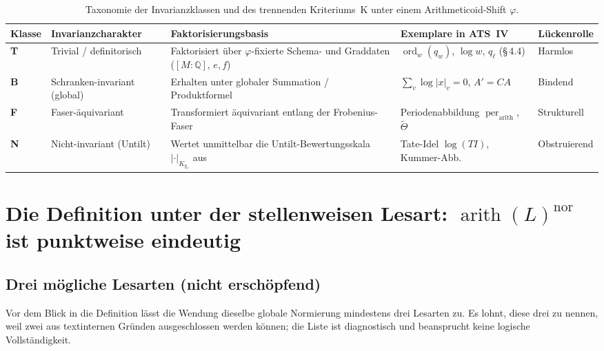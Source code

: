 \documentclass[11pt,a4paper]{article}
\theoremstyle{definition}
\theoremstyle{plain}
\theoremstyle{definition}
\newcommand{\arith}{\operatorname{arith}}
\newcommand{\ordd}{\operatorname{ord}}
\newcommand{\Thet}{\widetilde{\Theta}}
\begin{document}
\begin{table}[htbp]
\centering
\caption{Taxonomie der Invarianzklassen und des trennenden Kriteriums~K unter einem Arithmeticoid-Shift $\varphi$.}
\label{tab:invariance_classes}
\small
\setlength{\tabcolsep}{3.5pt}
\begin{tabular}{@{}P{0.07\textwidth}P{0.24\textwidth}P{0.24\textwidth}P{0.23\textwidth}P{0.14\textwidth}@{}}
\toprule
Klasse & Invarianzcharakter & Faktorisierungsbasis & Exemplare in ATS~IV & Lückenrolle \\
\midrule
\textbf{T} & Trivial / definitorisch & Faktorisiert über $\varphi$-fixierte Schema- und Graddaten ($[M:\mathbb{Q}]$, $e, f$) & $\ordd_w(q_w)$, $\log w$, $q_\ell$ (\S\,4.4) & Harmlos \\
\textbf{B} & Schranken-invariant (global) & Erhalten unter globaler Summation / Produktformel & $\sum_v \log |x|_v = 0$, $A' = CA$ & Bindend \\
\textbf{F} & Faser-äquivariant & Transformiert äquivariant entlang der Frobenius-Faser & Periodenabbildung $\operatorname{per}_{\arith}$, $\Thet$ & Strukturell \\
\textbf{N} & Nicht-invariant (Untilt) & Wertet unmittelbar die Untilt-Bewertungsskala $|\cdot|_{K_{y_v}}$ aus & Tate-Idel $\log(TI)$, Kummer-Abb. & Obstruierend \\
\bottomrule
\end{tabular}
\end{table}

\section{Die Definition unter der stellenweisen Lesart:
\texorpdfstring{$\arith(L)^{\mathrm{nor}}$}{arith(L)nor}
ist punktweise eindeutig}
\label{sec:definition}

\subsection{Drei mögliche Lesarten (nicht erschöpfend)}

Vor dem Blick in die Definition lässt die Wendung \glqq dieselbe globale
Normierung\grqq{} mindestens drei Lesarten zu. Es lohnt, diese drei zu nennen,
weil zwei aus textinternen Gründen ausgeschlossen werden können; die Liste ist
diagnostisch und beansprucht keine logische Vollständigkeit.
\end{document}
